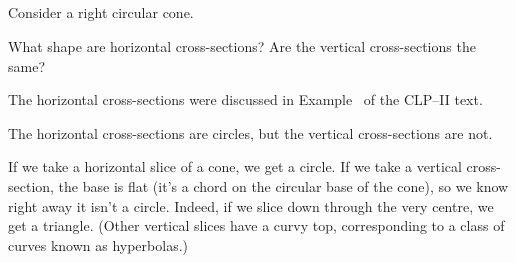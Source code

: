 %
%

\subsection*{\Conceptual}
\begin{question}
Consider a right circular cone.
\begin{center}
\end{center}
What shape are horizontal cross-sections? Are the vertical cross-sections the same?
\end{question}
\begin{hint}
The horizontal cross-sections were discussed in Example~ of
the CLP--II text.
\end{hint}
\begin{answer}
The horizontal cross-sections are circles, but the vertical cross-sections are not.
\end{answer}
\begin{solution}
If we take a horizontal slice of a cone, we get a circle. If we take a vertical cross-section, the base is flat (it's a chord on the circular base of the cone), so we know right away it isn't a circle. Indeed, if we slice down through the very centre, we get a triangle. (Other vertical slices have a curvy top, corresponding to  a class of curves known as hyperbolas.)
\end{solution}

